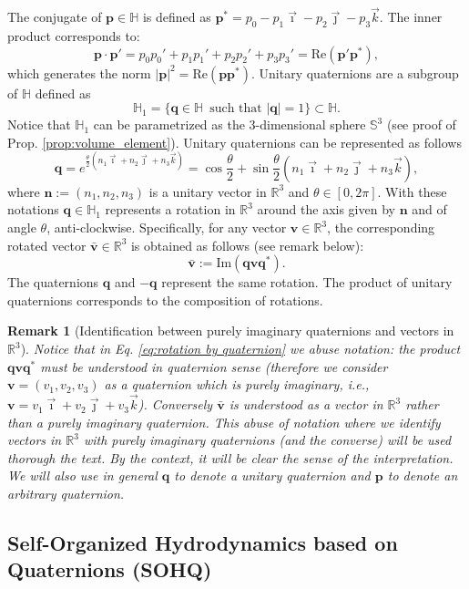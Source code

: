 \documentclass[12pt]{article}
\def\R{\mathbb{R}}
\newtheorem{remark}[theorem]{Remark}
\newcommand{\lp}{\left(}
\newcommand{\rp}{\right)}
\newcommand{\be}{\begin{equation}}
\newcommand{\ee}{\end{equation}}
\newcommand{\nvec}{\mathbf{n}}
\newcommand{\unitq}{{\mathbb{H}_1}}
\newcommand{\Ima}{\mbox{Im}}
\newcommand{\Real}{\mbox{Re}}
\newcommand{\q}{\mathbf{q}}
\newcommand{\p}{\mathbf{p}}
\begin{document}
The conjugate of $\p\in\mathbb{H}$ is defined as $\p^*=p_0- p_1\vec{\imath}-p_2\vec{\jmath}-p_3\vec{k}$. The inner product corresponds to:
\be \label{eq:inner product quaternions}
\p\cdot \p'=p_0p_0'+p_1p_1'+p_2p_2'+p_3p_3'= \Real(\p'\p^*),
\ee
which generates the norm $|\p|^2= \Real(\p\p^*)$. Unitary quaternions are a subgroup of $\mathbb{H}$ defined as
 $$\unitq=\{\q\in\mathbb{H}\, \mbox{ such that } |\q|=1\} \subset\mathbb{H}.$$
Notice that $\unitq$ can be parametrized as the 3-dimensional sphere $\mathbb{S}^3$ (see proof of Prop. \ref{prop:volume_element}). Unitary quaternions can be represented as follows 
\be \label{eq:exponential form unitary quaternion}
\q = e^{\frac{\theta}{2}(n_1 \vec{\imath}+n_2\vec{\jmath}+n_3\vec{k})}=\cos \frac{\theta}{2} + \sin\frac{\theta}{2}\lp n_1 \vec{\imath}+n_2\vec{\jmath}+n_3\vec{k} \rp,
\ee
where $\nvec:=(n_1,n_2,n_3)$ is a unitary vector in $\R^3$ and $\theta\in[0,2\pi]$. With these notations $\q \in \unitq$ represents a rotation in $\R^3$ around the axis given by $\nvec$ and of angle $\theta$, anti-clockwise. Specifically, for any vector $\mathbf{v}\in \R^3$,  the corresponding rotated vector $\mathbf{\bar v}\in \R^3$ is obtained as follows (see remark below):
\be  \label{eq:rotation by quaternion}
\mathbf{\bar v} := \Ima(\q \mathbf{v}\q^*).
\ee
The quaternions $\q$ and $-\q$ represent the same rotation. The product of unitary quaternions corresponds to the composition of rotations.
\begin{remark}[Identification between purely imaginary quaternions and vectors in $\R^3$]
\label{rem:abuse of notation}
Notice that in Eq. \eqref{eq:rotation by quaternion} we abuse notation: the product $\q \mathbf{v}\q^*$ must be understood in quaternion sense (therefore we consider $\mathbf{v}=(v_1,v_2,v_3)$ as a quaternion which is purely imaginary, i.e., $\mathbf{v}= v_1\vec{\imath}+v_2\vec{\jmath}+v_3\vec{k}$). Conversely $\mathbf{\bar v}$ is understood as a vector in $\R^3$ rather than a purely imaginary quaternion. This abuse of notation where we identify vectors in $\R^3$ with purely imaginary quaternions (and the converse) will be used thorough the text. By the context, it will be clear the sense of the interpretation.\\
We will also use in general $\q$ to denote a unitary quaternion and $\p$ to denote an arbitrary quaternion. 
\end{remark}


 
 
 

\subsection{Self-Organized Hydrodynamics based on Quaternions (SOHQ)}\label{sec:SOHQ}
\end{document}
